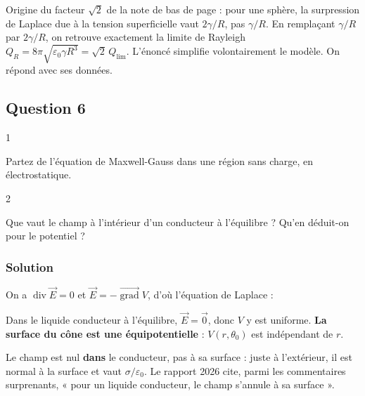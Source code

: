 \documentclass[11pt,a4paper]{article}
\newcommand{\equationajustee}[1]{%
  \sbox{\boiteequation}{$\displaystyle #1$}%
  \ifdim\wd\boiteequation>\linewidth
    \[\resizebox{\linewidth}{!}{\usebox{\boiteequation}}\]%
  \else
    \[#1\]%
  \fi}
\begin{document}
\begin{methode}

Origine du facteur \(\sqrt2\) de la note de bas de page : pour une sphère, la surpression de Laplace due à la tension superficielle vaut \(2\gamma/R\), pas \(\gamma/R\). En remplaçant \(\gamma/R\) par \(2\gamma/R\), on retrouve exactement la limite de Rayleigh \(Q_R=8\pi\sqrt{\varepsilon_0\gamma R^3}=\sqrt2\,Q_{\lim}\). L'énoncé simplifie volontairement le modèle. On répond avec ses données.

\end{methode}

\hypertarget{question-6}{%
\subsection{Question 6}\label{question-6}}

\begin{indication}{1}

Partez de l'équation de Maxwell-Gauss dans une région sans charge, en électrostatique.

\end{indication}

\begin{indication}{2}

Que vaut le champ à l'intérieur d'un conducteur à l'équilibre ? Qu'en déduit-on pour le potentiel ?

\end{indication}

\hypertarget{solution-5}{%
\subsubsection{Solution}\label{solution-5}}

On a \(\operatorname{div}\vec E=0\) et \(\vec E=-\overrightarrow{\operatorname{grad}}V\), d'où l'équation de Laplace :

\equationajustee{\boxed{\Delta V=0}}

Dans le liquide conducteur à l'équilibre, \(\vec E=\vec 0\), donc \(V\) y est uniforme. \textbf{La surface du cône est une équipotentielle} : \(V(r,\theta_0)\) est indépendant de \(r\).

\begin{piege}

Le champ est nul \textbf{dans} le conducteur, pas à sa surface : juste à l'extérieur, il est normal à la surface et vaut \(\sigma/\varepsilon_0\). Le rapport 2026 cite, parmi les commentaires surprenants, « pour un liquide conducteur, le champ s'annule à sa surface ».

\end{piege}
\end{document}
